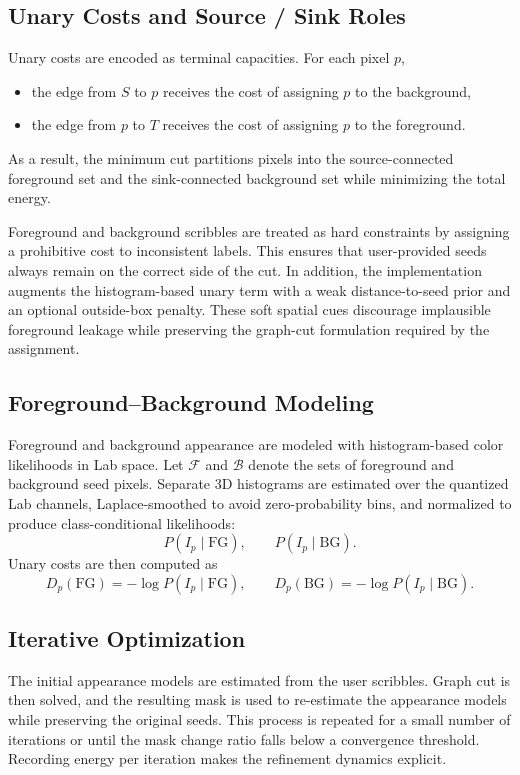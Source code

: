 \documentclass[conference]{IEEEtran}
\begin{document}
\subsection{Unary Costs and Source / Sink Roles}
Unary costs are encoded as terminal capacities. For each pixel \(p\),
\begin{itemize}
  \item the edge from \(S\) to \(p\) receives the cost of assigning \(p\) to the background,
  \item the edge from \(p\) to \(T\) receives the cost of assigning \(p\) to the foreground.
\end{itemize}
As a result, the minimum cut partitions pixels into the source-connected foreground set and the sink-connected background set while minimizing the total energy.

Foreground and background scribbles are treated as hard constraints by assigning a prohibitive cost to inconsistent labels. This ensures that user-provided seeds always remain on the correct side of the cut.
In addition, the implementation augments the histogram-based unary term with a weak distance-to-seed prior and an optional outside-box penalty. These soft spatial cues discourage implausible foreground leakage while preserving the graph-cut formulation required by the assignment.

\subsection{Foreground--Background Modeling}
Foreground and background appearance are modeled with histogram-based color likelihoods in Lab space. Let \(\mathcal{F}\) and \(\mathcal{B}\) denote the sets of foreground and background seed pixels. Separate 3D histograms are estimated over the quantized Lab channels, Laplace-smoothed to avoid zero-probability bins, and normalized to produce class-conditional likelihoods:
\begin{equation}
P(I_p \mid \text{FG}), \qquad P(I_p \mid \text{BG}).
\end{equation}
Unary costs are then computed as
\begin{equation}
D_p(\text{FG}) = -\log P(I_p \mid \text{FG}), \qquad D_p(\text{BG}) = -\log P(I_p \mid \text{BG}).
\end{equation}

\subsection{Iterative Optimization}
The initial appearance models are estimated from the user scribbles. Graph cut is then solved, and the resulting mask is used to re-estimate the appearance models while preserving the original seeds. This process is repeated for a small number of iterations or until the mask change ratio falls below a convergence threshold. Recording energy per iteration makes the refinement dynamics explicit.
\end{document}
